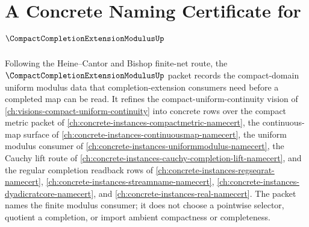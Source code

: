 \chapter{A Concrete Naming Certificate for $\CompactCompletionExtensionModulusUp$}
\label{ch:concrete-instances-compact-completion-extension-modulus-namecert}

Following the Heine--Cantor and Bishop finite-net route, the $\CompactCompletionExtensionModulusUp$ packet records the compact-domain uniform modulus data that completion-extension consumers need before a completed map can be read. It refines the compact-uniform-continuity vision of \autoref{ch:visions-compact-uniform-continuity} into concrete rows over the compact metric packet of \autoref{ch:concrete-instances-compactmetric-namecert}, the continuous-map surface of \autoref{ch:concrete-instances-continuousmap-namecert}, the uniform modulus consumer of \autoref{ch:concrete-instances-uniformmodulus-namecert}, the Cauchy lift route of \autoref{ch:concrete-instances-cauchy-completion-lift-namecert}, and the regular completion readback rows of \autoref{ch:concrete-instances-regseqrat-namecert}, \autoref{ch:concrete-instances-streamname-namecert}, \autoref{ch:concrete-instances-dyadicratcore-namecert}, and \autoref{ch:concrete-instances-real-namecert}. The packet names the finite modulus consumer; it does not choose a pointwise selector, quotient a completion, or import ambient compactness or completeness.

